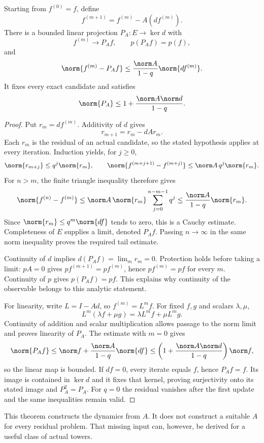 \begin{theorem}\label{KS19}
Starting from \(f^{(0)}=f\), define
\[
 f^{(m+1)}=f^{(m)}-A(df^{(m)}).
\]
There is a bounded linear projection \(P_A:E\to\ker d\) with
\[
 f^{(m)}\longrightarrow P_Af,\qquad p(P_Af)=p(f),
\]
and
\[
 \norm{f^{(m)}-P_Af}
 \le\frac{\norm A}{1-q}\norm{df^{(m)}}.
\]
It fixes every exact candidate and satisfies
\[
 \norm{P_A}\le1+\frac{\norm A\norm d}{1-q}.
\]
\end{theorem}
\begin{proof}
Put $r_m=df^{(m)}$. Additivity of $d$ gives
\[
 r_{m+1}=r_m-dAr_m.
\]
Each $r_m$ is the residual of an actual candidate, so the stated hypothesis applies at every iteration. Induction yields, for $j\ge0$,
\[
 \norm{r_{m+j}}\le q^j\norm{r_m},\qquad
 \norm{f^{(m+j+1)}-f^{(m+j)}}
 \le\norm A\,q^j\norm{r_m}.
\]
For $n>m$, the finite triangle inequality therefore gives
\[
 \norm{f^{(n)}-f^{(m)}}
 \le\norm A\,\norm{r_m}\sum_{j=0}^{n-m-1}q^j
 \le\frac{\norm A}{1-q}\norm{r_m}.
\]
Since $\norm{r_m}\le q^m\norm{df}$ tends to zero, this is a Cauchy estimate. Completeness of $E$ supplies a limit, denoted $P_Af$. Passing $n\to\infty$ in the same norm inequality proves the required tail estimate.

Continuity of $d$ implies $d(P_Af)=\lim_m r_m=0$. Protection holds before taking a limit: $pA=0$ gives $pf^{(m+1)}=pf^{(m)}$, hence $pf^{(m)}=pf$ for every $m$. Continuity of $p$ gives $p(P_Af)=pf$. This explains why continuity of the observable belongs to this analytic statement.

For linearity, write $L=I-Ad$, so $f^{(m)}=L^mf$. For fixed $f,g$ and scalars $\lambda,\mu$,
\[
 L^m(\lambda f+\mu g)=\lambda L^mf+\mu L^mg.
\]
Continuity of addition and scalar multiplication allows passage to the norm limit and proves linearity of $P_A$. The estimate with $m=0$ gives
\[
 \norm{P_Af}\le\norm f+\frac{\norm A}{1-q}\norm{df}
 \le\left(1+\frac{\norm A\norm d}{1-q}\right)\norm f,
\]
so the linear map is bounded. If $df=0$, every iterate equals $f$, hence $P_Af=f$. Its image is contained in $\ker d$ and it fixes that kernel, proving surjectivity onto its stated image and $P_A^2=P_A$. For $q=0$ the residual vanishes after the first update and the same inequalities remain valid.
\end{proof}
This theorem constructs the dynamics from \(A\). It does not construct a suitable \(A\) for every residual problem. That missing input can, however, be derived for a useful class of actual towers.

